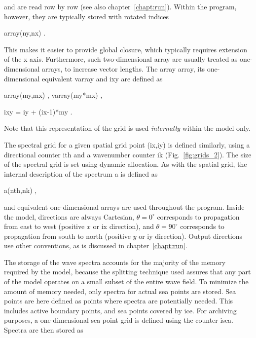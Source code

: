 \noindent
and are read row by row (see also chapter~\ref{chapt:run}). Within the
program, however, they are typically stored with rotated indices

\vspace{\baselineskip} \centerline{\F array(ny,nx) .} \vspace{\baselineskip}

\noindent
This makes it easier to provide global closure, which typically requires
extension of the x axis. Furthermore, such two-dimensional array are usually
treated as one-dimensional arrays, to increase vector lengths. The array {\F
array}, its one-dimensional equivalent {\F varray} and {\F ixy} are defined as

\vspace{\baselineskip}
\centerline{\F array(my,mx) , varray(my*mx) ,}
\centerline{\F ixy = iy + (ix-1)*my .}
\vspace{\baselineskip}

\noindent
Note that this representation of the grid is used {\it internally} within the
model only.



The spectral grid for a given spatial grid point {\F (ix,iy)} is defined
similarly, using a directional counter {\F ith} and a wavenumber counter {\F
ik} (Fig.~\ref{fig:grids_2}). The size of the spectral grid is set using
dynamic allocation. As with the spatial grid, the internal description of the
spectrum {\F a} is defined as

\vspace{\baselineskip}
\centerline{\F a(nth,nk) ,}
\vspace{\baselineskip}

\noindent
and equivalent one-dimensional arrays are used throughout the program. Inside
the model, directions are always Cartesian, $\theta = 0^\circ$ corresponds to
propagation from east to west (positive $x$ or {\F ix} direction), and $\theta
= 90^\circ$ corresponds to propagation from south to north (positive $y$ or
{\F iy} direction). Output directions use other conventions, as is discussed
in chapter~\ref{chapt:run}.

The storage of the wave spectra accounts for the majority of the memory
required by the model, because the splitting technique used assures that any
part of the model operates on a small subset of the entire wave field. To
minimize the amount of memory needed, only spectra for actual sea points are
stored. Sea points are here defined as points where spectra are potentially
needed. This includes active boundary points, and sea points covered by
ice. For archiving purposes, a one-dimensional sea point grid is defined using
the counter {\F isea}. Spectra are then stored as

